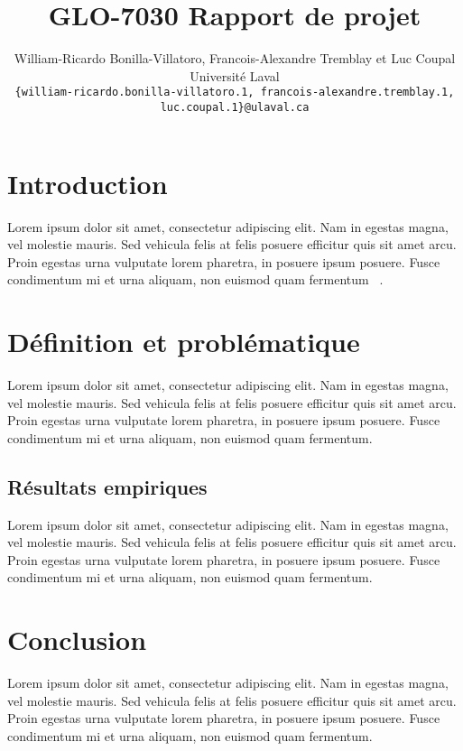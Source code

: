 \documentclass{article}
\title{GLO-7030 Rapport de projet}
\author{%
    \normalsize
    William-Ricardo Bonilla-Villatoro,
    Francois-Alexandre Tremblay
    \textnormal{et} Luc Coupal \\
    Université Laval \\
    {\scriptsize \texttt{\{william-ricardo.bonilla-villatoro.1, francois-alexandre.tremblay.1, luc.coupal.1\}@ulaval.ca}} \\
}
\begin{document}
    \maketitle

    \section{Introduction}
    Lorem ipsum dolor sit amet, consectetur adipiscing elit. Nam in egestas magna, vel molestie mauris. Sed vehicula felis at felis posuere efficitur quis sit amet arcu. Proin egestas urna vulputate lorem pharetra, in posuere ipsum posuere. Fusce condimentum mi et urna aliquam, non euismod quam fermentum ~\cite{Doyle1978}.

    \section{Définition et problématique}
    Lorem ipsum dolor sit amet, consectetur adipiscing elit. Nam in egestas magna, vel molestie mauris. Sed vehicula felis at felis posuere efficitur quis sit amet arcu. Proin egestas urna vulputate lorem pharetra, in posuere ipsum posuere. Fusce condimentum mi et urna aliquam, non euismod quam fermentum.

    \subsection{Résultats empiriques }
    Lorem ipsum dolor sit amet, consectetur adipiscing elit. Nam in egestas magna, vel molestie mauris. Sed vehicula felis at felis posuere efficitur quis sit amet arcu. Proin egestas urna vulputate lorem pharetra, in posuere ipsum posuere. Fusce condimentum mi et urna aliquam, non euismod quam fermentum.

    \section{Conclusion}
    Lorem ipsum dolor sit amet, consectetur adipiscing elit. Nam in egestas magna, vel molestie mauris. Sed vehicula felis at felis posuere efficitur quis sit amet arcu. Proin egestas urna vulputate lorem pharetra, in posuere ipsum posuere. Fusce condimentum mi et urna aliquam, non euismod quam fermentum.


    
\end{document}
